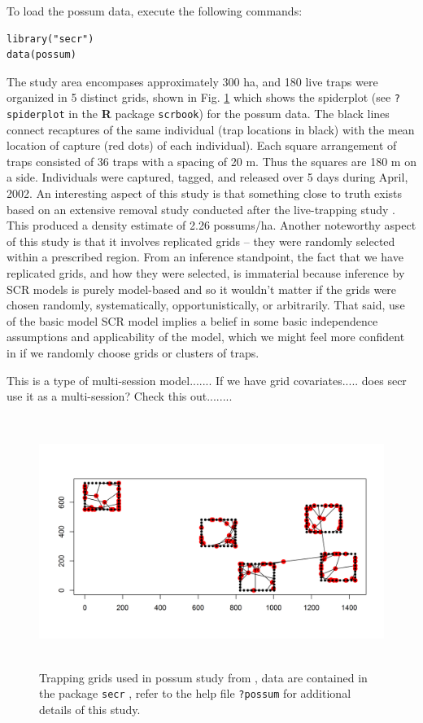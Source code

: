 To load the possum data, execute the following commands:
\begin{verbatim}
library("secr")
data(possum)
\end{verbatim}
The study area encompases approximately 300 ha, and 180 live traps
were
organized in 5 distinct grids, shown in  Fig. \ref{poisson-mn.fig.possum}
which shows the spiderplot (see \mbox{\tt ?spiderplot} in the {\bf R}
package \mbox{\tt scrbook}) for the possum data. The black lines
connect recaptures of the same individual (trap locations in black)
with the mean location of capture (red dots) of each individual).
Each square arrangement of traps consisted of
36 traps with a spacing of 20 m. Thus the squares are 180 m on a
side.
Individuals were captured, tagged, and released over 5 days during
April, 2002. An interesting aspect of this study is that something
close to truth exists based on an extensive removal study
conducted after the live-trapping study \citep{efford_etal:2005}. This
produced a density estimate of 2.26 possums/ha.  Another noteworthy
aspect of this study is that it involves
replicated grids -- they were randomly selected within a prescribed
region.
From an inference standpoint, the fact that we have replicated grids,
and how they were selected, is
immaterial because inference by SCR models is purely
model-based and so it wouldn't matter if the grids were chosen
randomly, systematically, opportunistically, or arbitrarily. That
said, use of the basic model SCR model implies a belief in some basic
independence
assumptions and applicability of the model, which we might
feel more confident in if we randomly choose grids or clusters of traps.

This is a type of multi-session model....... If we have grid
covariates..... does secr use it as a multi-session? Check this out........

\begin{figure}
\centering
\includegraphics[width=5in,height=3.2in]{Ch5-PoisMn/figs/possum.png}
\caption{Trapping grids used in possum study from
  \citet{efford_etal:2005}, data are contained in the \R
package \mbox{\tt secr}
\citep{efford:2011}, refer to the help file \mbox{\tt ?possum} for
additional details of this study.}
\label{poisson-mn.fig.possum}
\end{figure}

